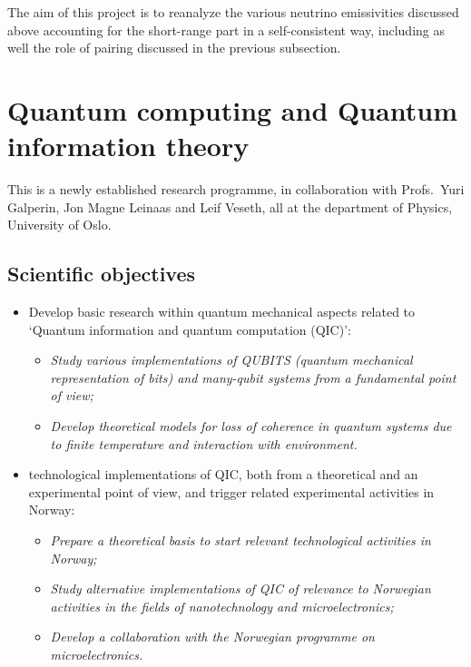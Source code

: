 The aim of this project is to reanalyze the various neutrino
emissivities discussed above accounting for the short-range part
in a self-consistent way, including as well the role
of pairing discussed in the previous subsection. 

\section{Quantum computing and Quantum information theory}

This is a newly established research programme, in collaboration
with Profs.~Yuri Galperin, Jon Magne Leinaas and Leif Veseth,
all at the department of Physics, University of Oslo.

\subsection{Scientific objectives}
\begin{itemize}
  \item Develop basic research within quantum mechanical aspects related
        to `Quantum information and quantum computation (QIC)':
\begin{itemize}
	\item {\sl Study various implementations of QUBITS (quantum mechanical
        representation of bits) and many-qubit systems from a
        fundamental point of view;}
	\item {\sl Develop theoretical models for loss of coherence in
quantum systems due to finite temperature and interaction with environment. }
\end{itemize}
  \item %
        technological implementations of QIC, both from a theoretical
        and an  experimental point of view, and trigger
        related experimental activities in Norway:
\begin{itemize}
\item {\sl Prepare a theoretical basis to start relevant technological
activities in Norway;}
\item{\sl Study alternative implementations
of QIC of relevance to
Norwegian activities in the fields of nanotechnology and microelectronics; }
\item {\sl Develop a collaboration with the Norwegian programme on
microelectronics.}
\end{itemize}

\end{itemize}

